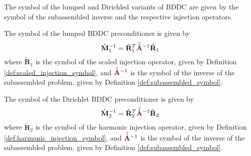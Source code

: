 The symbol of the lumped and Dirichled variants of BDDC are given by the symbol of the subassembled inverse and the respective injection operators.

\begin{definition}
The symbol of the lumped BDDC preconditioner is given by
\begin{equation}
\tilde{\mathbf{M}}^{-1}_1 = \tilde{\mathbf{R}}^T_1 \tilde{\hat{{\color{burgundy}\mathbf{A}}}}^{-1} \tilde{\mathbf{R}}_1
\end{equation}
where $\tilde{\mathbf{R}}_1$ is the symbol of the scaled injection operator, given by Definition \ref{def:scaled_injection_symbol}, and $\tilde{\hat{{\color{burgundy}\mathbf{A}}}}^{-1}$ is the symbol of the inverse of the subassembled problem, given by Definition \ref{def:subassembled_symbol}. 
\label{def:lumped_bddc_symbol}
\end{definition}

\begin{definition}
The symbol of the Dirichlet BDDC preconditioner is given by
\begin{equation}
\tilde{\mathbf{M}}^{-1}_2 = \tilde{\mathbf{R}}^T_2 \tilde{\hat{{\color{burgundy}\mathbf{A}}}}^{-1} \tilde{\mathbf{R}}_2
\end{equation}
where $\tilde{\mathbf{R}}_2$ is the symbol of the harmonic injection operator, given by Definition \ref{def:harmonic_injection_symbol}, and $\tilde{\hat{{\color{burgundy}\mathbf{A}}}}^{-1}$ is the symbol of the inverse of the subassembled problem, given by Definition \ref{def:subassembled_symbol}. 
\label{def:dirichlet_bddc_symbol}
\end{definition}
